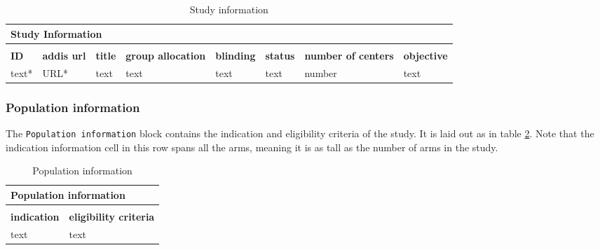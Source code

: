 \documentclass[a4paper,10pt]{article}
\begin{document}
\begin{table}[h]
  \small
  \centering
  \caption{Study information}
  \label{table:Study Information}
  \begin{tabular}{|l|l|l|l|l|l|l|l|}
    \hline
    \multicolumn{8}{|l|}{Study Information} \\ \hline
    \multicolumn{8}{|l|}{}                  \\ \hline
    \textbf{ID} & \textbf{addis url} & \textbf{title} & \textbf{group allocation} & \textbf{blinding} & \textbf{status} & \textbf{number of centers} & \textbf{objective} \\ \hline
    text* & URL* & text & text & text & text & number & text \\ \hline
  \end{tabular}
\end{table}

\subsubsection{Population information}
The \texttt{Population information} block contains the indication and eligibility criteria of the study. It is laid out as in table \ref{table:Population information}. Note that the indication information cell in this row spans all the arms, meaning it is as tall as the number of arms in the study.
\begin{table}[h]
  \centering
  \caption{Population information}
  \label{table:Population information}
  \begin{tabular}{|l|l|}
    \hline
    \multicolumn{2}{|l|}{\textbf{Population information}} \\ \hline
    \multicolumn{2}{|l|}{}                                \\ \hline
    \textbf{indication} & \textbf{eligibility criteria}   \\ \hline
    text & text                                           \\ \hline
  \end{tabular}
\end{table}
\end{document}
